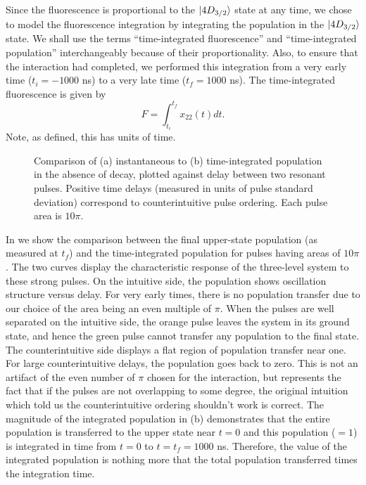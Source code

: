 Since the fluorescence is proportional to the $\vert 4D_{3/2} \rangle$ state at any
time, we chose to model the fluorescence integration by integrating the
population in the $\vert 4D_{3/2} \rangle$ state.  We shall use the terms
``time-integrated fluorescence'' and ``time-integrated population''
interchangeably because of their proportionality.  Also, to ensure that the
interaction had completed, we performed this integration from a very early
time ($t_i = -1000$ ns) to a very late time ($t_f = 1000$ ns).  The
time-integrated fluorescence is given by
\begin{equation}
F = \int_{t_i}^{t_f} x_{22}(t) dt.
\end{equation}
Note, as defined, this has units of time.

\begin{figure}[tbp]
\bigskip
{} {Comparison of (a) instantaneous to (b) time-integrated population
in the absence of decay, plotted against delay between two resonant
pulses.  Positive time delays (measured in units of pulse standard deviation)
correspond to counterintuitive pulse ordering.  Each pulse area is $ 10 \pi$.
\label{nodecay}}
\end{figure}

In  we show the comparison between the final upper-state
population (as measured at $t_f$) and the time-integrated population for
pulses having areas of $10 \pi$.  The two curves display the characteristic
response of the three-level system to these strong pulses.  On the intuitive
side, the population shows oscillation structure versus delay.  For very early
times, there is no population transfer due to our choice of the area being an
even multiple of $\pi$.  When the pulses are well separated on the intuitive
side, the orange pulse leaves the system in its ground state, and hence the green
pulse cannot transfer any population to the final state.  The counterintuitive
side displays a flat region of population transfer near one.  For large
counterintuitive delays, the population goes back to zero.  This is not an
artifact of the even number of $\pi$ chosen for the interaction, but represents
the fact that if the pulses are not overlapping to some degree, the original
intuition which told us the counterintuitive ordering shouldn't work is
correct.  The magnitude of the integrated population in (b)
demonstrates that the entire population is transferred to the upper state near
$t=0$ and this population ($=1$) is integrated in time from $t=0$ to
$t=t_f=1000$ ns.  Therefore, the value of the integrated population is nothing
more that the total population transferred times the integration time.


